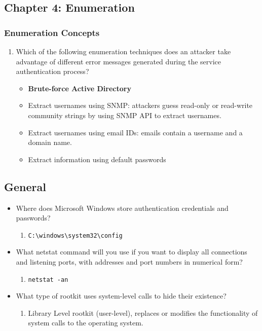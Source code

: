 \subsection{Chapter 4: Enumeration}
\subsubsection{Enumeration Concepts}
\begin{enumerate}
    \item Which of the following enumeration techniques does an attacker take advantage of different error messages generated during the service authentication process?
    \begin{itemize}
        \item \textbf{Brute-force Active Directory}
        \item Extract usernames using SNMP: attackers guess read-only or read-write community strings by using SNMP API to extract usernames.
        \item Extract usernames using email IDs: emails contain a username and a domain name.
        \item Extract information using default passwords
    \end{itemize}
\end{enumerate}
\subsection{}

\subsection{General}
\begin{itemize}
    \item Where does Microsoft Windows store authentication credentials and passwords?
    \begin{enumerate}
        \item \verb|C:\windows\system32\config|
    \end{enumerate}
    \item What netstat command will you use if you want to display all connections and listening ports, with addresses and port numbers in numerical form?
    \begin{enumerate}
        \item \verb|netstat -an|
    \end{enumerate}
    \item What type of rootkit uses system-level calls to hide their existence?
    \begin{enumerate}
        \item Library Level rootkit (user-level), replaces or modifies the functionality of system calls to the operating system.
    \end{enumerate}
\end{itemize}